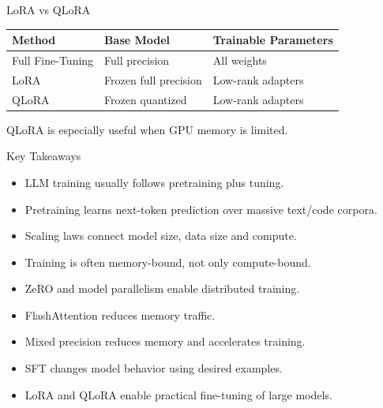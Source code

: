 \documentclass[aspectratio=169]{beamer}
\begin{document}
\begin{frame}{LoRA vs QLoRA}

\begin{table}
\centering
\begin{tabular}{lll}
\toprule
Method & Base Model & Trainable Parameters \\
\midrule
Full Fine-Tuning & Full precision & All weights \\
LoRA & Frozen full precision & Low-rank adapters \\
QLoRA & Frozen quantized & Low-rank adapters \\
\bottomrule
\end{tabular}
\end{table}

\vspace{0.5cm}

QLoRA is especially useful when GPU memory is limited.

\end{frame}

\begin{frame}{Key Takeaways}

\begin{itemize}
    \item LLM training usually follows pretraining plus tuning.
    \item Pretraining learns next-token prediction over massive text/code corpora.
    \item Scaling laws connect model size, data size and compute.
    \item Training is often memory-bound, not only compute-bound.
    \item ZeRO and model parallelism enable distributed training.
    \item FlashAttention reduces memory traffic.
    \item Mixed precision reduces memory and accelerates training.
    \item SFT changes model behavior using desired examples.
    \item LoRA and QLoRA enable practical fine-tuning of large models.
\end{itemize}

\end{frame}
\end{document}
